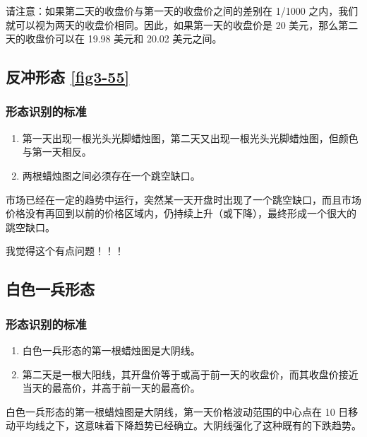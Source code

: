 请注意：如果第二天的收盘价与第一天的收盘价之间的差别在 1/1000 之内，我们就可以视为两天的收盘价相同。因此，如果第一天的收盘价是 20 美元，那么第二天的收盘价可以在 19.98 美元和 20.02 美元之间。
\subsection{反冲形态 \autoref{fig3-55}}
\subsubsection*{形态识别的标准}
\begin{enumerate}
    \item 第一天出现一根光头光脚蜡烛图，第二天又出现一根光头光脚蜡烛图，但颜色与第一天相反。
    \item 两根蜡烛图之间必须存在一个跳空缺口。
\end{enumerate}

市场已经在一定的趋势中运行，突然某一天开盘时出现了一个跳空缺口，而且市场价格没有再回到以前的价格区域内，仍持续上升（或下降），最终形成一个很大的跳空缺口。

\begin{tcolorbox}
    我觉得这个有点问题！！！
\end{tcolorbox}
\subsection{白色一兵形态}
\subsubsection*{形态识别的标准}
\begin{enumerate}
    \item 白色一兵形态的第一根蜡烛图是大阴线。
    \item 第二天是一根大阳线，其开盘价等于或高于前一天的收盘价，而其收盘价接近当天的最高价，并高于前一天的最高价。
\end{enumerate}

白色一兵形态的第一根蜡烛图是大阴线，第一天价格波动范围的中心点在 10 日移动平均线之下，这意味着下降趋势已经确立。大阴线强化了这种既有的下跌趋势。

